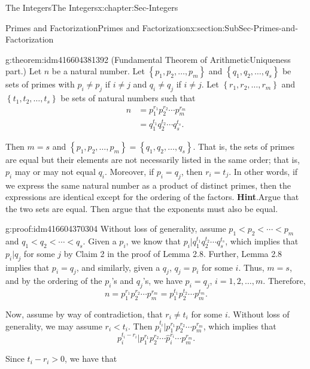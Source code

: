 \documentclass[oneside,10pt,]{book}
\numberwithin{equation}{section}
\newcommand{\set}[1]{\left\{ {#1} \right\}}
\newcommand{\lt}{<}
\newcommand{\amp}{&}
\begin{document}
\begin{chapterptx}{The Integers}{}{The Integers}{}{}{x:chapter:Sec-Integers}
\begin{sectionptx}{Primes and Factorization}{}{Primes and Factorization}{}{}{x:section:SubSec-Primes-and-Factorization}
\begin{theorem}{}{}{g:theorem:idm416604381392}
(Fundamental Theorem of Arithmetic\textendash{}Uniqueness part.) Let \(n\) be a natural number. Let \(\set{p_1,p_2,\ldots,p_m}\) and \(\set{q_1,q_2,\ldots,q_s}\) be sets of primes with \(p_i\ne p_j\) if \(i\ne j\) and \(q_i\ne q_j\) if \(i\ne j\). Let \(\set{r_1,r_2,\ldots,r_m}\) and \(\set{t_1,t_2,\ldots,t_s}\) be sets of natural numbers such that%
\begin{align*}
n \amp = p_1^{r_1} p_2^{r_2} \cdots p_m^{r_m}\\
\amp = q_1^{t_1} q_2^{t_2} \cdots q_s^{t_s}\text{.}
\end{align*}
%
\par
Then \(m = s\) and \(\set{p_1,p_2,\ldots,p_m} = \set{q_1,q_2,\ldots,q_s}\). That is, the sets of primes are equal but their elements are not necessarily listed in the same order; that is, \(p_i\) may or may not equal \(q_i\). Moreover, if \(p_i = q_j\), then \(r_i = t_j\). In other words, if we express the same natural number as a product of distinct primes, then the expressions are identical except for the ordering of the factors.%
\textbf{Hint}.\quad{}Argue that the two sets are equal. Then argue that the exponents must also be equal.%
\end{theorem}
\begin{proofptx}{}{g:proof:idm416604370304}
Without loss of generality, assume \(p_1 \lt  p_2 \lt  \cdots \lt  p_m\) and \(q_1 \lt  q_2 \lt  \cdots \lt  q_s\). Given a \(p_i\), we know that \(p_i | q_1^{t_1} q_2^{t_2} \cdots q_s^{t_s}\), which implies that \(p_i | q_j\) for some \(j\) by Claim 2 in the proof of Lemma 2.8. Further, Lemma 2.8 implies that \(p_i = q_j\), and similarly, given a \(q_j\), \(q_j = p_i\) for some \(i\). Thus, \(m =s\), and by the ordering of the \(p_i\)'s and \(q_j\)'s, we have \(p_i = q_j\), \(i = 1, 2, \ldots, m\). Therefore,%
\begin{equation*}
n = p_1^{r_1} p_2^{r_2} \cdots p_m^{r_m} = p_1^{t_1} p_2^{t_2} \cdots p_m^{t_m}\text{.}
\end{equation*}
%
\par
Now, assume by way of contradiction, that \(r_i \ne t_i\) for some \(i\). Without loss of generality, we may assume \(r_i \lt  t_i\). Then \(p_i^{t_i} | p_1^{r_1} p_2^{r_2} \cdots p_m^{r_m}\), which implies that%
\begin{equation*}
p_i^{t_i - r_i} | p_1^{r_1} p_2^{r_2} \cdots \hat{p}_i^{r_i} \cdots p_m^{r_m}\text{.}
\end{equation*}
%
\par
Since \(t_i - r_i > 0\), we have that%
\begin{equation*}

\end{equation*}
\end{proofptx}
\end{sectionptx}
\end{chapterptx}
\end{document}
